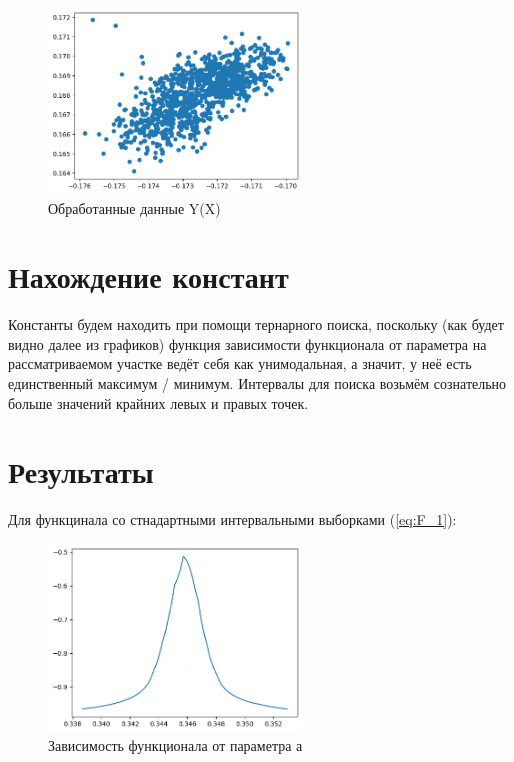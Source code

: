 \documentclass{article}
\begin{document}
  \begin{figure}[htbp!]
    \begin{center}
        \includegraphics[width = 0.6\textwidth]{first_channel_fixed}
        \caption{Обработанные данные Y(X)}
    \label{figure:first_channel_fixed}
    \end{center}
    \end{figure}

    \newpage
  
  \section{Нахождение констант}
  
  Константы будем находить при помощи тернарного поиска, поскольку (как будет видно далее из графиков) функция зависимости функционала от параметра на рассматриваемом участке ведёт себя как унимодальная, а значит, у неё есть единственный максимум / минимум.
  Интервалы для поиска возьмём сознательно больше значений крайних левых и правых точек.
  \newpage
  \section{Результаты}

  Для функцинала со стнадартными интервальными выборками (\ref{eq:F_1}):

  \begin{figure}[htbp!]
    \begin{center}
        \includegraphics[width = 0.6\textwidth]{a_simple}
        \caption{Зависимость функционала от параметра а}
  \label{figure:a_simple}
    \end{center}
  \end{figure}
\end{document}
